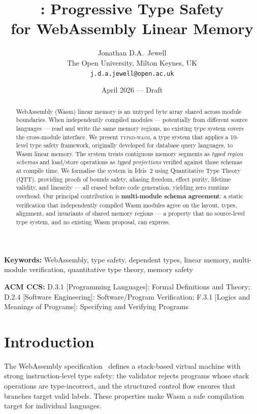 \documentclass[11pt,a4paper]{article}
\title{\typedwasm{}: Progressive Type Safety\\for WebAssembly Linear Memory}
\author{
  Jonathan D.A.\ Jewell\\
  The Open University, Milton Keynes, UK\\
  \texttt{j.d.a.jewell@open.ac.uk}
}
\date{April 2026 --- Draft}
\newcommand{\typedwasm}{\textsc{typed-wasm}}
\begin{document}
\maketitle

\begin{abstract}
WebAssembly (Wasm) linear memory is an untyped byte array shared across
module boundaries.  When independently compiled modules --- potentially from
different source languages --- read and write the same memory regions, no
existing type system covers the cross-module interface.  We present
\typedwasm{}, a type system that applies a 10-level type safety
framework, originally developed for database query languages, to Wasm
linear memory.  The system treats contiguous memory segments as \emph{typed
region schemas} and load/store operations as \emph{typed projections}
verified against those schemas at compile time.  We formalise the system
in Idris~2 using Quantitative Type Theory (QTT), providing proofs of
bounds safety, aliasing freedom, effect purity, lifetime validity, and
linearity --- all erased before code generation, yielding zero runtime
overhead.  Our principal contribution is \textbf{multi-module schema
agreement}: a static verification that independently compiled Wasm
modules agree on the layout, types, alignment, and invariants of shared
memory regions --- a property that no source-level type system, and no
existing Wasm proposal, can express.
\end{abstract}

\medskip
\noindent\textbf{Keywords:}
WebAssembly, type safety, dependent types, linear memory,
multi-module verification, quantitative type theory, memory safety

\medskip
\noindent\textbf{ACM CCS:}
D.3.1 [Programming Languages]: Formal Definitions and Theory;
D.2.4 [Software Engineering]: Software/Program Verification;
F.3.1 [Logics and Meanings of Programs]: Specifying and Verifying Programs

\newpage
\tableofcontents
\newpage

\section{Introduction}
\label{sec:introduction}

The WebAssembly specification~\cite{haas2017} defines a stack-based
virtual machine with strong instruction-level type safety: the validator
rejects programs whose stack operations are type-incorrect, and the
structured control flow ensures that branches target valid labels.  These
properties make Wasm a safe compilation target for individual languages.
\end{document}
